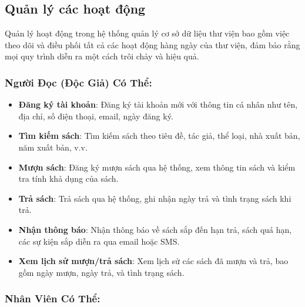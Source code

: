 \documentclass[12pt]{article}
\begin{document}
\subsection{Quản lý các hoạt động}
Quản lý hoạt động trong hệ thống quản lý cơ sở dữ liệu thư viện bao gồm việc theo dõi và điều phối tất cả các hoạt động hàng ngày của thư viện, đảm bảo rằng mọi quy trình diễn ra một cách trôi chảy và hiệu quả.
\subsubsection*{Người Đọc (Độc Giả) Có Thể:}

\begin{itemize}
    \item \textbf{Đăng ký tài khoản}: Đăng ký tài khoản mới với thông tin cá nhân như tên, địa chỉ, số điện thoại, email, ngày đăng ký.
    \item \textbf{Tìm kiếm sách}: Tìm kiếm sách theo tiêu đề, tác giả, thể loại, nhà xuất bản, năm xuất bản, v.v.
    \item \textbf{Mượn sách}: Đăng ký mượn sách qua hệ thống, xem thông tin sách và kiểm tra tính khả dụng của sách.
    \item \textbf{Trả sách}: Trả sách qua hệ thống, ghi nhận ngày trả và tình trạng sách khi trả.
    \item \textbf{Nhận thông báo}: Nhận thông báo về sách sắp đến hạn trả, sách quá hạn, các sự kiện sắp diễn ra qua email hoặc SMS.
    \item \textbf{Xem lịch sử mượn/trả sách}: Xem lịch sử các sách đã mượn và trả, bao gồm ngày mượn, ngày trả, và tình trạng sách.
\end{itemize}

\subsubsection*{Nhân Viên Có Thể:}
\end{document}
